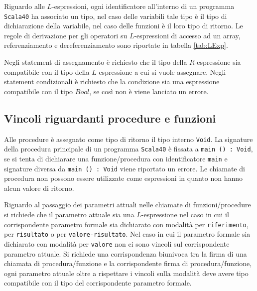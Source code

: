 Riguardo alle $L$-espressioni, ogni identificatore all'interno di un programma \texttt{Scala40} ha associato un tipo, nel caso delle variabili tale tipo è il tipo di dichiarazione della variabile, nel caso delle funzioni è il loro tipo di ritorno. Le regole di derivazione per gli operatori su $L$-espressioni di accesso ad un array, referenziamento e dereferenziamento sono riportate in tabella \ref{tab:LExp}.

\begin{table}[]
\caption{Regole di derivazione per gli operatori su $L$-espressioni.}
\label{tab:LExp}
\end{table}

Negli statement di assegnamento è richiesto che il tipo della $R$-espressione sia compatibile con il tipo della $L$-espressione a cui si vuole assegnare.
Negli statement condizionali è richiesto che la condizione sia una espressione compatibile con il tipo $Bool$, se così non è viene lanciato un errore.

\subsection*{Vincoli riguardanti procedure e funzioni}
Alle procedure è assegnato come tipo di ritorno il tipo interno \texttt{Void}.
La signature della procedura principale di un programma \texttt{Scala40} è fissata a \texttt{main () : Void}, se si tenta di dichiarare una funzione/procedura con identificatore \texttt{main} e signature diversa da \texttt{main () : Void} viene riportato un errore.
Le chiamate di procedura non possono essere utilizzate come espressioni in quanto non hanno alcun valore di ritorno.

Riguardo al passaggio dei parametri attuali nelle chiamate di funzioni/procedure si richiede che il parametro attuale sia una $L$-espressione nel caso in cui il corrispondente parametro formale sia dichiarato con modalità per \texttt{riferimento}, per \texttt{risultato} o per \texttt{valore-risultato}. Nel caso in cui il parametro formale sia dichiarato con modalità per \texttt{valore} non ci sono vincoli sul corrispondente parametro attuale.
Si richiede una corrispondenza biunivoca tra la firma di una chiamata di procedura/funzione e la corrispondente firma di procedura/funzione, ogni parametro attuale oltre a rispettare i vincoli sulla modalità deve avere tipo compatibile con il tipo del corrispondente parametro formale.

